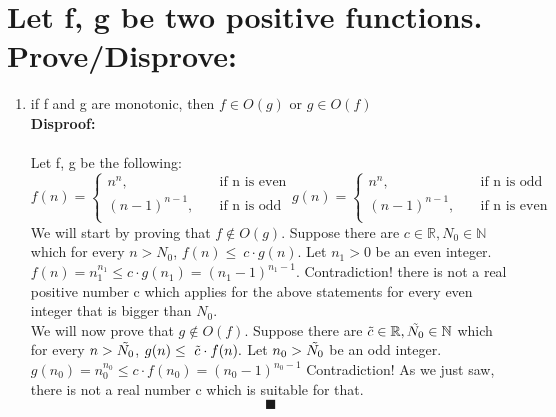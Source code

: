 \documentclass{article}
\begin{document}
\section{Let f, g be two positive functions. Prove/Disprove:}
\begin{enumerate}
    \item if f and g are monotonic, then $f\in{}O(g)$ or $g\in{}O(f)$\\
    \textbf{Disproof:}\\\\
    Let f, g be the following:\\
    \[
    f(n)=
        \begin{cases}
            \text{$n^{n},$} &\quad\text{if n is even}\\
            \text{$(n-1)^{n-1}, $} &\quad\text{if n is odd}\\
        \end{cases}
    g(n)=
        \begin{cases}
            \text{$n^{n},$} &\quad\text{if n is odd}\\
            \text{$(n-1)^{n-1}, $} &\quad\text{if n is even}\\
        \end{cases}
    \]
    We will start by proving that $f\notin{}O(g)$. Suppose there are $c\in\mathbb{R}, N_0\in\mathbb{N}$ which for every $n>N_0$, $f(n)\le\ c\cdot g(n).$ Let $n_1>0$ be an even integer. $f(n)=n_1^{n_1}\le c\cdot g(n_1)=(n_1-1)^{n_1-1}.$ Contradiction! there is not a real positive number c which applies for the above statements for every even integer that is bigger than $N_0$.\\
    We will now prove that $g\notin{}O(f)$. Suppose there are $\Tilde{c}\in\mathbb{R}, \Tilde{N_0}\in\mathbb{N}$ which for every $n>\Tilde{N_0}$, $g(n)\le\ \Tilde{c}\cdot f(n).$ Let $n_0>\Tilde{N_0}$ be an odd integer. $g(n_0)=n_0^{n_0}\le c\cdot f(n_0) = (n_0-1)^{n_0-1}$ Contradiction! As we just saw, there is not a real number c which is suitable for that.
    $$\blacksquare$$\\


\end{enumerate}
\end{document}
